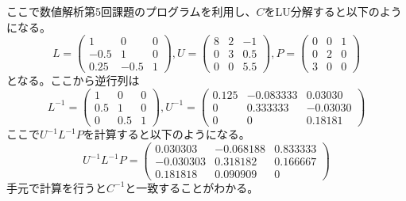 \documentclass[titlepage]{jsarticle}
\begin{document}
		ここで数値解析第5回課題のプログラムを利用し、$C$をLU分解すると以下のようになる。
		\begin{equation}
	            	L = \left(
	                \begin{array}{ccc}
	                    1 & 0 & 0 \\
	                    -0.5 & 1 & 0 \\
	                    0.25 & -0.5 & 1
	                \end{array}
	            \right),
			U=\left(
	                \begin{array}{ccc}
	                    8 & 2 & -1 \\
	                    0 & 3 & 0.5 \\
	                    0 & 0 & 5.5
	                \end{array}	
	            \right),
			P=\left(
	                \begin{array}{ccc}
	                    0 & 0 & 1 \\
	                    0 & 2 & 0 \\
	                    3 & 0 & 0
	                \end{array}	
	            \right)\nonumber
		\end{equation}
		となる。ここから逆行列は
		\begin{equation}
	            	L^{-1} = \left(
	                \begin{array}{ccc}
	                    1 & 0 & 0 \\
	                    0.5 & 1 & 0 \\
	                    0   & 0.5 & 1
	                \end{array}
	            \right),
			U^{-1}=\left(
	                \begin{array}{ccc}
	                    0.125 & -0.083333 & 0.03030 \\
	                    0 & 0.333333 & -0.03030 \\
	                    0 & 0 & 0.18181
	                \end{array}	
	            \right)\nonumber
		\end{equation}
		ここで$U^{-1}L^{-1}P$を計算すると以下のようになる。
		\begin{equation}
	            	U^{-1}L^{-1}P = \left(
	                \begin{array}{ccc}
	                    0.030303 & -0.068188 & 0.833333 \\
	                    -0.030303 & 0.318182 & 0.166667 \\
	                    0.181818 &  0.090909 & 0
	                \end{array}
	            \right)\nonumber
		\end{equation}
		手元で計算を行うと$C^{-1}$と一致することがわかる。
\end{document}
